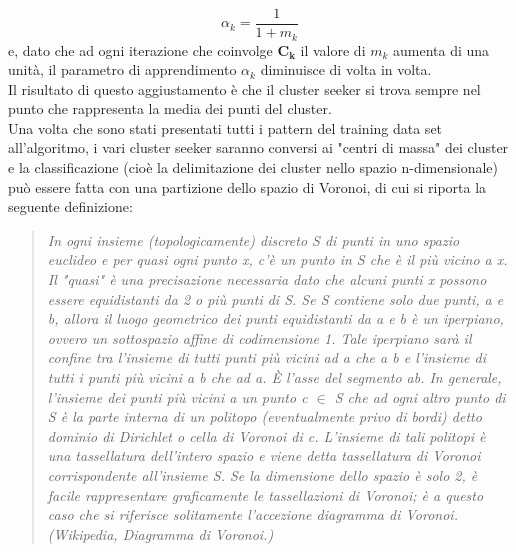 \begin{equation}
\alpha_k = \frac{1}{1 + m_k}
\end{equation} 
e, dato che ad ogni iterazione che coinvolge $\textbf{C}_\textbf{k}$ il valore di $m_k$ aumenta di una unità, il parametro di apprendimento $\alpha_k$ diminuisce di volta in volta. \\
Il risultato di questo aggiustamento è che il cluster seeker si trova sempre nel punto che rappresenta la media dei punti del cluster. \\
Una volta che sono stati presentati tutti i pattern del training data set all'algoritmo, i vari cluster seeker saranno conversi ai "centri di massa" dei cluster e la classificazione (cioè la delimitazione dei cluster nello spazio n-dimensionale) può essere fatta con una partizione dello spazio di Voronoi, di cui si riporta la seguente definizione:
\begin{quotation} \small
	\textit{In ogni insieme (topologicamente) discreto S di punti in uno spazio euclideo e per quasi ogni punto x, c'è un punto in S che è il più vicino a x. Il "quasi" è una precisazione necessaria dato che alcuni punti x possono essere equidistanti da 2 o più punti di S.
		Se S contiene solo due punti, a e b, allora il luogo geometrico dei punti equidistanti da a e b è un iperpiano, ovvero un sottospazio affine di codimensione 1. Tale iperpiano sarà il confine tra l'insieme di tutti punti più vicini ad a che a b e l'insieme di tutti i punti più vicini a b che ad a. È l'asse del segmento ab.
		In generale, l'insieme dei punti più vicini a un punto c $\in$ S che ad ogni altro punto di S è la parte interna di un politopo (eventualmente privo di bordi) detto dominio di Dirichlet o cella di Voronoi di c. L'insieme di tali politopi è una tassellatura dell'intero spazio e viene detta tassellatura di Voronoi corrispondente all'insieme S. Se la dimensione dello spazio è solo 2, è facile rappresentare graficamente le tassellazioni di Voronoi; è a questo caso che si riferisce solitamente l'accezione diagramma di Voronoi. \\
		(Wikipedia, Diagramma di Voronoi.)} 
\end{quotation}

